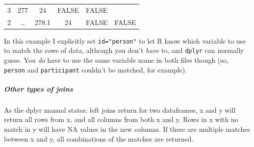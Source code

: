 \documentclass[]{article}
\let\oldsubparagraph\subparagraph
\renewcommand{\subparagraph}[1]{\oldsubparagraph{#1}\mbox{}}
\theoremstyle{definition}
\theoremstyle{definition}
\theoremstyle{definition}
\theoremstyle{remark}
\begin{document}
\begin{longtable}[]{@{}cccccc@{}}
\begin{minipage}[t]{0.09\columnwidth}
3\strut
\end{minipage} & \begin{minipage}[t]{0.09\columnwidth}\centering\strut
277\strut
\end{minipage} & \begin{minipage}[t]{0.07\columnwidth}\centering\strut
24\strut
\end{minipage} & \begin{minipage}[t]{0.16\columnwidth}\centering\strut
FALSE\strut
\end{minipage} & \begin{minipage}[t]{0.09\columnwidth}\centering\strut
FALSE\strut
\end{minipage}\tabularnewline
\begin{minipage}[t]{0.10\columnwidth}\centering\strut
2\strut
\end{minipage} & \begin{minipage}[t]{0.09\columnwidth}\centering\strut
\ldots{}\strut
\end{minipage} & \begin{minipage}[t]{0.09\columnwidth}\centering\strut
278.1\strut
\end{minipage} & \begin{minipage}[t]{0.07\columnwidth}\centering\strut
24\strut
\end{minipage} & \begin{minipage}[t]{0.16\columnwidth}\centering\strut
FALSE\strut
\end{minipage} & \begin{minipage}[t]{0.09\columnwidth}\centering\strut
FALSE\strut
\end{minipage}\tabularnewline
\bottomrule
\end{longtable}

In this example I explicitly set \texttt{id="person"} to let R know
which variable to use to match the rows of data, although you don't
\emph{have} to, and \texttt{dplyr} can normally guess. You \emph{do}
have to use the same variable name in both files though (so,
\texttt{person} and \texttt{participant} couldn't be matched, for
example).

\subparagraph{Other types of joins}\label{other-types-of-joins}

As the dplyr manual states: left joins return for two dataframes, x and
y will return all rows from x, and all columns from both x and y. Rows
in x with no match in y will have NA values in the new columns. If there
are multiple matches between x and y, all combinations of the matches
are returned.
\end{document}
